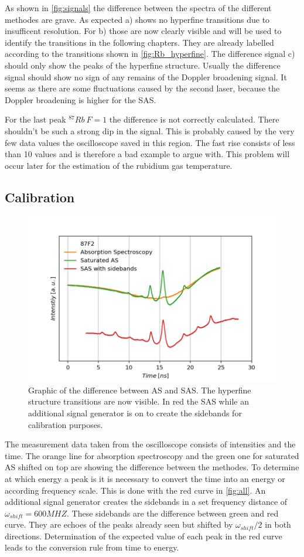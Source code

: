 \documentclass[]{article}
\begin{document}
As shown in \autoref{fig:signals} the difference between the spectra of the different methodes are grave. As expected a) shows no hyperfine transitions due to insufficent resolution. For b) those are now clearly visible and will be used to identify the transitions in the following chapters. They are already labelled according to the transitions shown in \ref{fig:Rb_hyperfine}.
The difference signal c) should only show the peaks of the hyperfine structure.
Usually the difference signal should show no sign of any remains of the Doppler broadening signal. It seems as there are some fluctuations caused by the second laser, because the Doppler broadening is higher for the SAS. 

For the last peak  $^{87}Rb\ F=1$ the difference is not correctly calculated. There shouldn't be such a strong dip in the signal. This is probably caused by the very few data values the oscilloscope saved in this region. The fast rise consists of less than 10 values and is therefore a bad example to argue with. This problem will occur later for the estimation of the rubidium gas temperature.


\subsection{Calibration}
\begin{figure}[H]
\centering
\includegraphics[width=.8\textwidth]{Plots/Calibration_Second_All.png}
\caption{Graphic of the difference between AS and SAS. The hyperfine structure transitions are now visible. In red the SAS while an additional signal generator is on to create the sidebands for calibration purposes.}
\label{fig:all}
\end{figure}

The measurement data taken from the oscilloscope consists of intensities and the time. The orange line for absorption spectroscopy and the green one for saturated AS shifted on top are showing the difference between the methodes.
To determine at which energy a peak is it is necessary to convert the time into an energy or according frequency scale. This is done with the red curve in \autoref{fig:all}. An additional signal generator creates the sidebands in a set frequency distance of $\omega_{shift}=600MHZ$. These sidebands are the difference between green and red curve. They are echoes of the peaks already seen but shifted by $\omega_{shift}/2$ in both directions. Determination of the expected value of each peak in the red curve leads to the conversion rule from time to energy. 
\end{document}
